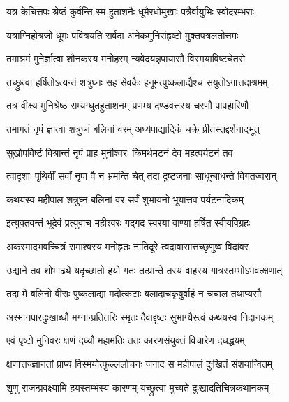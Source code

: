\twolineshloka
{यत्र केचित्तपः श्रेष्ठं कुर्वन्ति स्म हुताशनैः}
{धूमैरधोमुखाः पत्रैर्वायुभिः स्वोदरम्भराः}%

\twolineshloka
{यत्राग्निहोत्रजो धूमः पवित्रयति सर्वदा}
{अनेकमुनिसंहृष्टो मुक्तपत्रलतोत्तमः}%

\twolineshloka
{तमाश्रमं मुनेर्ज्ञात्वा शौनकस्य मनोहरम्}
{न्यवेदयन्नृपायासौ विस्मयाविष्टचेतसे}%

\twolineshloka
{तच्छ्रुत्वा हर्षितोऽत्यन्तं शत्रुघ्नः सह सेवकैः}
{हनूमत्पुष्कलाद्यैश्च सयुतोऽगात्तदाश्रमम्}%

\twolineshloka
{तत्र वीक्ष्य मुनिश्रेष्ठं सम्यग्घुतहुताशनम्}
{प्रणम्य दण्डवत्तस्य चरणौ पापहारिणौ}%

\twolineshloka
{तमागतं नृपं ज्ञात्वा शत्रुघ्नं बलिनां वरम्}
{अर्घ्यपाद्यादिकं चक्रे प्रीतस्तद्दर्शनादभूत्}%

\twolineshloka
{सुखोपविष्टं विश्रान्तं नृपं प्राह मुनीश्वरः}
{किमर्थमटनं देव महत्पर्यटनं तव}%

\twolineshloka
{त्वादृशाः पृथिवीं सर्वां नृपा वै न भ्रमन्ति चेत्}
{तदा दुष्टजनाः साधून्बाधन्ते विगतज्वरान्}%

\twolineshloka
{कथयस्व महीपाल शत्रुघ्न बलिनां वर}
{सर्वं शुभायनो भूयात्तव पर्यटनादिकम्}%


\twolineshloka
{इत्युक्तवन्तं भूदेवं प्रत्युवाच महीश्वरः}
{गद्गद स्वरया वाण्या हर्षित स्वीयविग्रहः}%


\twolineshloka
{अकस्मादभवच्चित्रं रामाश्वस्य मनोहृतः}
{नातिदूरे त्वदावासात्तच्छृणुष्व विदांवर}%

\twolineshloka
{उद्याने तव शोभाढ्ये यदृच्छातो हयो गतः}
{तत्प्रान्ते तस्य वाहस्य गात्रस्तम्भोऽभवत्क्षणात्}%

\twolineshloka
{तदा मे बलिनो वीराः पुष्कलाद्या मदोत्कटाः}
{बलादाचकृषुर्वाहं न चचाल तथाप्यसौ}%

\twolineshloka
{अस्मानपारदुःखाब्धौ मग्नान्प्रतितरिः स्मृतः}
{दैवाद्दृष्टः सुभाग्यैस्त्वं कथयस्व निदानकम्}%


\twolineshloka
{एवं पृष्टो मुनिवरः क्षणं दध्यौ महामतिः}
{ततः कारणसंयुक्तं विचारेण दधद्धयम्}%

\twolineshloka
{क्षणात्तज्ज्ञानतां प्राप्य विस्मयोत्फुल्ललोचनः}
{जगाद स महीपालं दुःखितं संशयान्वितम्}%


\twolineshloka
{शृणु राजन्प्रवक्ष्यामि हयस्तम्भस्य कारणम्}
{यच्छ्रुत्वा मुच्यते दुःखादतिचित्रकथानकम्}%


